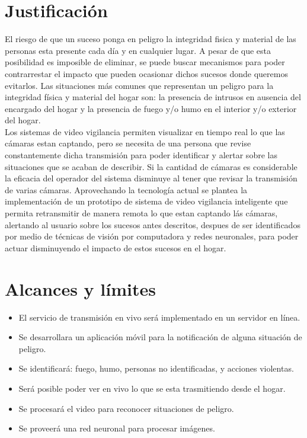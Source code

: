 \section{Justificación}
El riesgo de que un suceso ponga en peligro la integridad fisica y material de las personas esta presente cada día y en cualquier lugar. A pesar de que esta posibilidad es imposible de eliminar, se puede buscar mecanismos para poder contrarrestar el impacto que pueden ocasionar dichos sucesos donde queremos evitarlos. Las situaciones más comunes que representan un peligro para la integridad física y material del hogar son: la presencia de intrusos en ausencia del encargado del hogar y la presencia de fuego y/o humo en el interior y/o exterior del hogar.\\

Los sistemas de video vigilancia permiten visualizar en tiempo real lo que las cámaras estan captando, pero se necesita de una persona que revise constantemente dicha transmisión para poder identificar y alertar sobre las situaciones que se acaban de describir. Si la cantidad de cámaras es considerable la eficacia del operador del sistema disminuye al tener que revisar la transmisión de varias cámaras. Aprovechando la tecnología actual se plantea la implementación de un prototipo de sistema de video vigilancia inteligente que permita retransmitir de manera remota lo que estan captando lás cámaras, alertando al usuario sobre los sucesos antes descritos, despues de ser identificados por medio de técnicas de visión por computadora y redes neuronales, para poder actuar disminuyendo el impacto de estos sucesos en el hogar.

\section{Alcances y límites}
\begin{itemize}
    \item El servicio de transmisión en vivo será implementado en un servidor en línea.
    \item Se desarrollara un aplicación móvil para la notificación de alguna situación de peligro.
    \item Se identificará: fuego, humo, personas no identificadas, y acciones violentas.
    \item Será posible poder ver en vivo lo que se esta trasmitiendo desde el hogar.
    \item Se procesará el video para reconocer situaciones de peligro.
    \item Se proveerá una red neuronal para procesar imágenes.
\end{itemize}